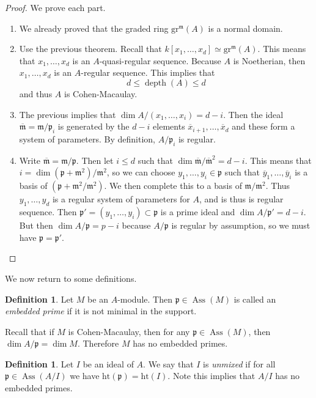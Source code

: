 \documentclass[leqno, openany]{memoir}
\theoremstyle{definition}
\newtheorem{defn}[thm]{Definition}
\theoremstyle{remark}
\theoremstyle{plain}
\theoremstyle{definition}
\theoremstyle{remark}
\newcommand{\mf}[1]{\mathfrak{#1}}
\newcommand{\mr}[1]{\mathrm{#1}}
\newcommand{\ol}[1]{\overline{#1}}
\DeclareMathOperator{\Ass}{Ass}
\DeclareMathOperator{\dpth}{depth}
\begin{document}
\begin{proof}
    We prove each part.
    \begin{enumerate}
        \item We already proved that the graded ring $\mr{gr}^{\mf{m}}(A)$ is a normal domain.
        \item  Use the previous theorem. Recall that $k[x_1, \ldots, x_d] \simeq \mr{gr}^{\mf{m}}(A)$. This means that $x_1, \ldots, x_d$ is an $A$-quasi-regular sequence. Because $A$ is Noetherian, then $x_1, \ldots, x_d$ is an $A$-regular sequence. This implies that
            \[ d \leq \dpth(A) \leq d \]
            and thus $A$ is Cohen-Macaulay.
        \item The previous implies that $\dim A / (x_1, \ldots, x_i) = d-i$. Then the ideal $\ol{\mf{m}} = \mf{m} / \mf{p}_i$ is generated by the $d-i$ elements $\ol{x}_{i+1}, \ldots, \ol{x}_d$ and these form a system of parameters. By definition, $A/ \mf{p}_i$ is regular.
        \item Write $\ol{\mf{m}} = \mf{m} / \mf{p}$. Then let $i \leq d$ such that $\dim \ol{\mf{m}} / \ol{\mf{m}}^2 = d-i$. This means that $i = \dim ( \mf{p}+\mf{m}^2  )/ \mf{m^2}$, so we can choose $y_1, \ldots, y_i \in \mf{p}$ such that $\ol{y}_1, \ldots, \ol{y}_i$ is a basis of $(\mf{p} + \mf{m}^2 / \mf{m}^2)$. We then complete this to a basis of $\mf{m} / \mf{m}^2$. Thus $y_1, \ldots, y_d$ is a regular system of parameters for $A$, and is thus is regular sequence. Then $\mf{p}' = (y_1, \ldots, y_i) \subset \mf{p}$ is a prime ideal and $\dim A/\mf{p}' = d-i$. But then $\dim A/\mf{p} = p-i$ because $A/\mf{p}$ is regular by assumption, so we must have $\mf{p} = \mf{p}'$. \qedhere
    \end{enumerate}
\end{proof}

We now return to some definitions.

\begin{defn}
    Let $M$ be an $A$-module. Then $\mf{p} \in \Ass(M)$ is called an \textit{embedded prime} if it is not minimal in the support. 
\end{defn}

Recall that if $M$ is Cohen-Macaulay, then for any $\mf{p} \in \Ass(M)$, then $\dim A/\mf{p} = \dim M$. Therefore $M$ has no embedded primes.

\begin{defn}
    Let $I$ be an ideal of $A$. We say that $I$ is \textit{unmixed} if for all $\mf{p} \in \Ass(A/I)$ we have $\mr{ht}(\mf{p}) = \mr{ht}(I)$. Note this implies that $A/I$ has no embedded primes. 
\end{defn}
\end{document}
